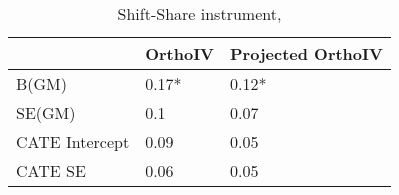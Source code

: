\begin{table}\centering\caption{Shift-Share instrument, }\begin{tabular}{lll}
\toprule
                & OrthoIV   & Projected OrthoIV   \\
\midrule
 B(GM)          & 0.17*     & 0.12*               \\
 SE(GM)         & 0.1       & 0.07                \\
 CATE Intercept & 0.09      & 0.05                \\
 CATE SE        & 0.06      & 0.05                \\
\bottomrule
\end{tabular}\end{table}